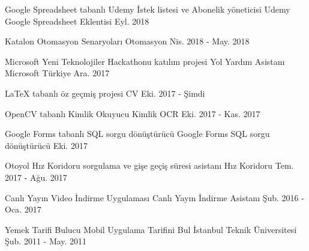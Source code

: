 \begin{cventries}
  \cventry
    {Google Spreadsheet tabanlı Udemy İstek listesi ve Abonelik yöneticisi} %
    {Udemy Google Spreadsheet Eklentisi} %
    {} %
    {Eyl. 2018} %
    {}

  \cventry
    {Katalon Otomasyon Senaryoları} %
    {Otomasyon} %
    {} %
    {Nis. 2018 - May. 2018} %
    {}

  \cventry
    {Microsoft Yeni Teknolojiler Hackathonu katılım projesi} %
    {Yol Yardım Asistanı} %
    {Microsoft Türkiye} %
    {Ara. 2017} %
    {}

  \cventry
    {LaTeX tabanlı öz geçmiş projesi} %
    {CV} %
    {} %
    {Eki. 2017 - Şimdi} %
    {}

  \cventry
    {OpenCV tabanlı Kimlik Okuyucu} %
    {Kimlik OCR} %
    {} %
    {Eki. 2017 - Kas. 2017} %
    {}

  \cventry
    {Google Forms tabanlı SQL sorgu dönüştürücü} %
    {Google Forms SQL sorgu dönüştürücü} %
    {} %
    {Eki. 2017} %
    {}

  \cventry
    {Otoyol Hız Koridoru sorgulama ve gişe geçiş süresi asistanı} %
    {Hız Koridoru} %
    {} %
    {Tem. 2017 - Ağu. 2017} %
    {}

  \cventry
    {Canlı Yayın Video İndirme Uygulaması} %
    {Canlı Yayın İndirme Asistanı} %
    {} %
    {Şub. 2016 - Oca. 2017} %
    {}

  \cventry
    {Yemek Tarifi Bulucu Mobil Uygulama} %
    {Tarifini Bul} %
    {İstanbul Teknik Üniversitesi} %
    {Şub. 2011 - May. 2011} %
    {}

\end{cventries}
